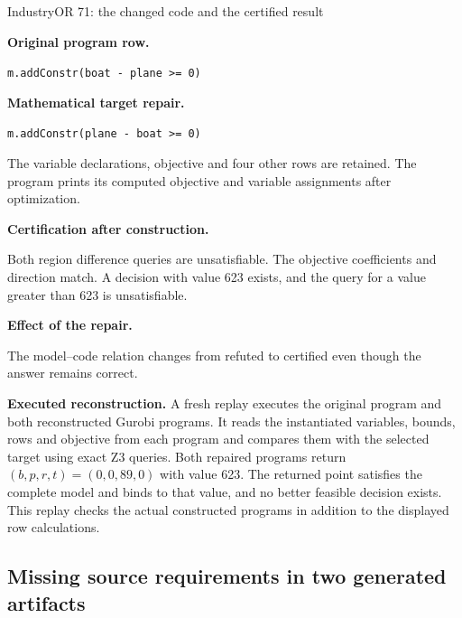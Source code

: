 \begin{evidencecase}{IndustryOR 71: the changed code and the certified result}
\begin{minipage}[t]{0.475\linewidth}\vspace{0pt}\small
\textcolor{verdictblue}{\textbf{Original program row.}}\par\smallskip
\texttt{m.addConstr(boat - plane >= 0)}\par\medskip
\textcolor{verdictgreen}{\textbf{Mathematical target repair.}}\par\smallskip
\texttt{m.addConstr(plane - boat >= 0)}\par\medskip
The variable declarations, objective and four other rows are retained. The program prints its
computed objective and variable assignments after optimization.
\end{minipage}\hfill
\begin{minipage}[t]{0.475\linewidth}\vspace{0pt}\small
\textcolor{verdictgreen}{\textbf{Certification after construction.}}\par\smallskip
Both region difference queries are unsatisfiable. The objective coefficients and direction match.
A decision with value 623 exists, and the query for a value greater than 623 is unsatisfiable.\par\medskip
\textcolor{verdictblue}{\textbf{Effect of the repair.}}\par\smallskip
The model--code relation changes from refuted to certified even though the answer remains correct.
\end{minipage}
\end{evidencecase}

\textbf{Executed reconstruction.} A fresh replay executes the original program and both
reconstructed Gurobi programs. It reads the instantiated variables, bounds, rows and objective from
each program and compares them with the selected target using exact Z3 queries. Both repaired
programs return \((b,p,r,t)=(0,0,89,0)\) with value 623. The returned point satisfies the complete
model and binds to that value, and no better feasible decision exists. This replay checks the
actual constructed programs in addition to the displayed row calculations.

\subsection{Missing source requirements in two generated artifacts}
\label{app:mamoexample}


